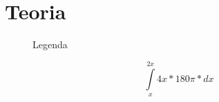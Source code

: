 \section{Teoria}
\lipsum[1]
\begin{figure}[h]
	\caption{Legenda}
	\label{fig:placeholder.jpg}
\end{figure}
\begin{center}
	\begin{equation}
	\int\limits_{x}^{2x} 4x*180\pi*dx
	\end{equation}
\end{center}
